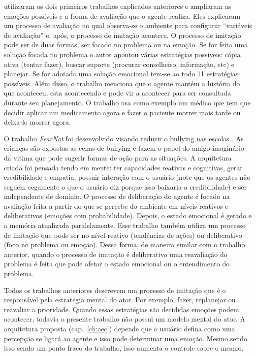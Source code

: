 \citet{gratch2004domain} utilizaram os dois primeiros trabalhos explicados
anteriores e ampliaram as emoções possíveis e a forma de avaliação que o
agente realiza. Eles explicaram um processo de avaliação no qual observa-se
o ambiente para configurar ``variáveis de avaliação'' e, após, o
processo de imitação acontece. O processo de imitação pode ser de duas formas,
ser focado no problema ou na emoção. Se for feita uma solução focada no
problema o autor apontou várias estratégias possíveis: cópia ativa (tentar
fazer), buscar suporte (procurar conselheiro, informação, etc) e planejar. Se
for adotada uma solução emocional tem-se ao todo 11 estratégias possíveis.
Além disso, o trabalho menciona que o agente
mantém a história do que aconteceu, esta acontecendo e pode vir a
acontecer para ser consultada durante seu planejamento. O trabalho usa como
exemplo um médico que tem que decidir aplicar um medicamento agora e fazer o
paciente morrer mais tarde ou deixa-lo morrer agora.

O trabalho \emph{FearNot} foi desenvolvido visando reduzir o bullying nas
escolas \cite{dias2005feeling}. As crianças são expostas as cenas de bullying
e fazem o papel do amigo imaginário da vitima que pode sugerir formas de ação
para as situações. A arquitetura criada foi pensada tendo em
mente: ter capacidades reativas e cognitivas, gerar credibilidade e empatia,
possuir interação com o usuário (note que os agentes não seguem cegamente o que
o usuário diz porque isso baixaria a credibilidade) e ser independente de
domínio.
%
O processo de deliberação do agente é focado na avaliação feita a partir do
que se percebe do ambiente em níveis reativos e deliberativos (emoções com
probabilidade). Depois, o estado emocional é gerado e a memória atualizada
paralelamente. Esse trabalho também utiliza um processo de imitação que pode
ser no nível reativo (tendências de ações) ou deliberativo (foco no problema
ou emoção). Dessa forma, de maneira similar com o trabalho anterior, quando o
processo de imitação é deliberativo uma reavaliação do problema é feita que
pode afetar o estado emocional ou o entendimento do problema.

Todos os trabalhos anteriores descrevem um processo de imitação que é o
responsável pela estrategia mental do ator. Por exemplo, fazer, replanejar ou
reavaliar a prioridade. Quando essas estratégias são decididas emoções podem
acontecer, todavia o presente trabalho não possui um modelo mental do ator. A
arquitetura proposta (cap.~\ref{ch:aec}) depende que o usuário defina como uma percepção se ligará
ao agente e isso pode determinar uma emoção. Mesmo sendo isso sendo um ponto
fraco do trabalho, isso aumenta o controle sobre o mesmo.

